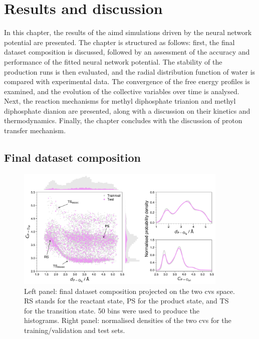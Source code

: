 \chapter{Results and discussion}
In this chapter, the results of the \ac{aimd} simulations driven by the neural network potential are presented. The chapter is structured as follows: first, the final dataset composition is discussed, followed by an assessment of the accuracy and performance of the fitted neural network potential. The stability of the production runs is then evaluated, and the radial distribution function of water is compared with experimental data. The convergence of the free energy profiles is examined, and the evolution of the collective variables over time is analysed. Next, the reaction mechanisms for methyl diphosphate trianion and methyl diphosphate dianion are presented, along with a discussion on their kinetics and thermodynamics. Finally, the chapter concludes with the discussion of proton transfer mechanism.

\section{Final dataset composition}

\begin{figure}[t!]
    \centering
    \includegraphics[width=0.9\textwidth]{Figures/4_Results/results_final_dataset_with_histograms.png}
    \caption{Left panel: final dataset composition projected on the two \acp{cv} space. RS stands for the reactant state, PS for the product state, and TS for the transition state. 50 bins were used to produce the histograms. Right panel: normalised densities of the two \acp{cv} for the training/validation and test sets.}
    \label{fig:final_dataset}
\end{figure}

